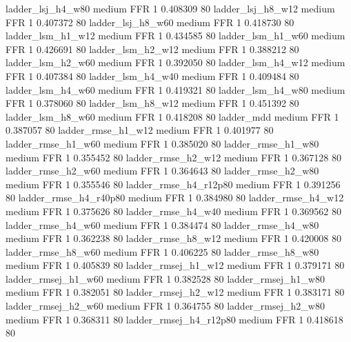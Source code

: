      ladder_lsj_h4_w80     medium      FFR                 1 0.408309 80
     ladder_lsj_h8_w12     medium      FFR                 1 0.407372 80
     ladder_lsj_h8_w60     medium      FFR                 1 0.418730 80
     ladder_lsm_h1_w12     medium      FFR                 1 0.434585 80
     ladder_lsm_h1_w60     medium      FFR                 1 0.426691 80
     ladder_lsm_h2_w12     medium      FFR                 1 0.388212 80
     ladder_lsm_h2_w60     medium      FFR                 1 0.392050 80
     ladder_lsm_h4_w12     medium      FFR                 1 0.407384 80
     ladder_lsm_h4_w40     medium      FFR                 1 0.409484 80
     ladder_lsm_h4_w60     medium      FFR                 1 0.419321 80
     ladder_lsm_h4_w80     medium      FFR                 1 0.378060 80
     ladder_lsm_h8_w12     medium      FFR                 1 0.451392 80
     ladder_lsm_h8_w60     medium      FFR                 1 0.418208 80
            ladder_mdd     medium      FFR                 1 0.387057 80
    ladder_rmse_h1_w12     medium      FFR                 1 0.401977 80
    ladder_rmse_h1_w60     medium      FFR                 1 0.385020 80
    ladder_rmse_h1_w80     medium      FFR                 1 0.355452 80
    ladder_rmse_h2_w12     medium      FFR                 1 0.367128 80
    ladder_rmse_h2_w60     medium      FFR                 1 0.364643 80
    ladder_rmse_h2_w80     medium      FFR                 1 0.355546 80
 ladder_rmse_h4_r12p80     medium      FFR                 1 0.391256 80
 ladder_rmse_h4_r40p80     medium      FFR                 1 0.384980 80
    ladder_rmse_h4_w12     medium      FFR                 1 0.375626 80
    ladder_rmse_h4_w40     medium      FFR                 1 0.369562 80
    ladder_rmse_h4_w60     medium      FFR                 1 0.384474 80
    ladder_rmse_h4_w80     medium      FFR                 1 0.362238 80
    ladder_rmse_h8_w12     medium      FFR                 1 0.420008 80
    ladder_rmse_h8_w60     medium      FFR                 1 0.406225 80
    ladder_rmse_h8_w80     medium      FFR                 1 0.405839 80
   ladder_rmsej_h1_w12     medium      FFR                 1 0.379171 80
   ladder_rmsej_h1_w60     medium      FFR                 1 0.382528 80
   ladder_rmsej_h1_w80     medium      FFR                 1 0.382051 80
   ladder_rmsej_h2_w12     medium      FFR                 1 0.383171 80
   ladder_rmsej_h2_w60     medium      FFR                 1 0.364755 80
   ladder_rmsej_h2_w80     medium      FFR                 1 0.368311 80
ladder_rmsej_h4_r12p80     medium      FFR                 1 0.418618 80
